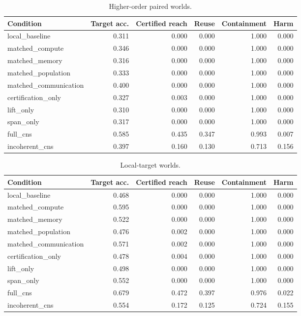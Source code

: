 \begin{table}[p]
\centering
\caption{Higher-order paired worlds.}\label{tab:high}
\small
\begin{tabular}{lrrrrr}
\toprule Condition & Target acc. & Certified reach & Reuse & Containment & Harm \\ \midrule
local\_baseline & 0.311 & 0.000 & 0.000 & 1.000 & 0.000 \\
matched\_compute & 0.346 & 0.000 & 0.000 & 1.000 & 0.000 \\
matched\_memory & 0.316 & 0.000 & 0.000 & 1.000 & 0.000 \\
matched\_population & 0.333 & 0.000 & 0.000 & 1.000 & 0.000 \\
matched\_communication & 0.400 & 0.000 & 0.000 & 1.000 & 0.000 \\
certification\_only & 0.327 & 0.003 & 0.000 & 1.000 & 0.000 \\
lift\_only & 0.310 & 0.000 & 0.000 & 1.000 & 0.000 \\
span\_only & 0.317 & 0.000 & 0.000 & 1.000 & 0.000 \\
full\_cns & 0.585 & 0.435 & 0.347 & 0.993 & 0.007 \\
incoherent\_cns & 0.397 & 0.160 & 0.130 & 0.713 & 0.156 \\
\bottomrule
\end{tabular}
\end{table}

\begin{table}[p]
\centering
\caption{Local-target worlds.}\label{tab:local}
\small
\begin{tabular}{lrrrrr}
\toprule Condition & Target acc. & Certified reach & Reuse & Containment & Harm \\ \midrule
local\_baseline & 0.468 & 0.000 & 0.000 & 1.000 & 0.000 \\
matched\_compute & 0.595 & 0.000 & 0.000 & 1.000 & 0.000 \\
matched\_memory & 0.522 & 0.000 & 0.000 & 1.000 & 0.000 \\
matched\_population & 0.476 & 0.002 & 0.000 & 1.000 & 0.000 \\
matched\_communication & 0.571 & 0.002 & 0.000 & 1.000 & 0.000 \\
certification\_only & 0.478 & 0.004 & 0.000 & 1.000 & 0.000 \\
lift\_only & 0.498 & 0.000 & 0.000 & 1.000 & 0.000 \\
span\_only & 0.552 & 0.000 & 0.000 & 1.000 & 0.000 \\
full\_cns & 0.679 & 0.472 & 0.397 & 0.976 & 0.022 \\
incoherent\_cns & 0.554 & 0.172 & 0.125 & 0.724 & 0.155 \\
\bottomrule
\end{tabular}
\end{table}

